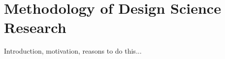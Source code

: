 \chapter{Methodology of Design Science Research}
\label{cha:methodology_of_design_science_research}


Introduction, motivation, reasons to do this...